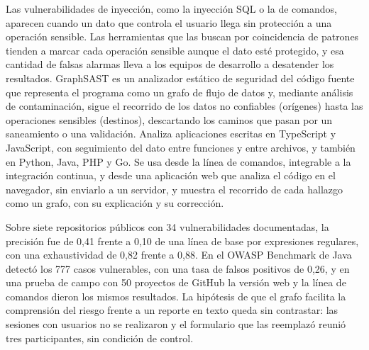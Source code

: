 %

\begin{resumen}

Las vulnerabilidades de inyección, como la inyección SQL o la de
comandos, aparecen cuando un dato que controla el usuario llega sin
protección a una operación sensible. Las herramientas que las buscan por
coincidencia de patrones tienden a marcar cada operación sensible aunque
el dato esté protegido, y esa cantidad de falsas alarmas lleva a los
equipos de desarrollo a desatender los resultados. GraphSAST es un
analizador estático de seguridad del código fuente que representa el
programa como un grafo de flujo de datos y, mediante análisis de
contaminación, sigue el recorrido de los datos no confiables (orígenes)
hasta las operaciones sensibles (destinos), descartando los caminos que
pasan por un saneamiento o una validación. Analiza aplicaciones escritas
en TypeScript y JavaScript, con seguimiento del dato entre funciones y
entre archivos, y también en Python, Java, PHP y Go. Se usa desde la
línea de comandos, integrable a la integración continua, y desde una
aplicación web que analiza el código en el navegador, sin enviarlo a un
servidor, y muestra el recorrido de cada hallazgo como un grafo, con su
explicación y su corrección.

Sobre siete repositorios públicos con 34 vulnerabilidades documentadas,
la precisión fue de 0,41 frente a 0,10 de una línea de base por
expresiones regulares, con una exhaustividad de 0,82 frente a 0,88. En
el OWASP Benchmark de Java detectó los 777 casos vulnerables, con una
tasa de falsos positivos de 0,26, y en una prueba de campo con 50
proyectos de GitHub la versión web y la línea de comandos dieron los
mismos resultados. La hipótesis de que el grafo facilita la comprensión
del riesgo frente a un reporte en texto queda sin contrastar: las
sesiones con usuarios no se realizaron y el formulario que las reemplazó
reunió tres participantes, sin condición de control.

\end{resumen}
